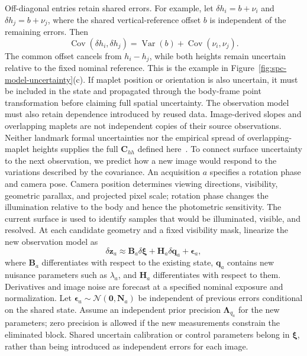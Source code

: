 Off-diagonal entries retain shared errors. For example, let $\delta h_i=b+\nu_i$ and $\delta h_j=b+\nu_j$, where the shared vertical-reference offset $b$ is independent of the remaining errors. Then
\begin{equation}
    \operatorname{Cov}(\delta h_i,\delta h_j)
    =\operatorname{Var}(b)+\operatorname{Cov}(\nu_i,\nu_j).
    \label{eq:uncertainty-shared-reference}
\end{equation}
The common offset cancels from $h_i-h_j$, while both heights remain uncertain relative to the fixed nominal reference. This is the example in Figure~\ref{fig:spc-model-uncertainty}(c). If maplet position or orientation is also uncertain, it must be included in the state and propagated through the body-frame point transformation before claiming full spatial uncertainty.
The observation model must also retain dependence introduced by reused data. Image-derived slopes and overlapping maplets are not independent copies of their source observations. Neither landmark formal uncertainties nor the empirical spread of overlapping-maplet heights supplies the full $\mathbf C_{hh}$ defined here~\citep{gaskell2023,weirich2022}.
To connect surface uncertainty to the next observation, we predict how a new image would respond to the variations described by the covariance. An acquisition $a$ specifies a rotation phase and camera pose. Camera position determines viewing directions, visibility, geometric parallax, and projected pixel scale; rotation phase changes the illumination relative to the body and hence the photometric sensitivity. The current surface is used to identify samples that would be illuminated, visible, and resolved. At each candidate geometry and a fixed visibility mask, linearize the new observation model as
\begin{equation}
    \delta\mathbf z_a\approx
        \mathbf B_a\delta\boldsymbol\xi+
        \mathbf H_a\delta\mathbf q_a+\boldsymbol\epsilon_a,
    \label{eq:uncertainty-new-measurement}
\end{equation}
where $\mathbf B_a$ differentiates with respect to the existing state, $\mathbf q_a$ contains new nuisance parameters such as $\lambda_a$, and $\mathbf H_a$ differentiates with respect to them. Derivatives and image noise are forecast at a specified nominal exposure and normalization. Let $\boldsymbol\epsilon_a\sim\mathcal N(\mathbf0,\mathbf N_a)$ be independent of previous errors conditional on the shared state. Assume an independent prior precision $\boldsymbol\Lambda_{q_a}$ for the new parameters; zero precision is allowed if the new measurements constrain the eliminated block. Shared uncertain calibration or control parameters belong in $\boldsymbol\xi$, rather than being introduced as independent errors for each image.
